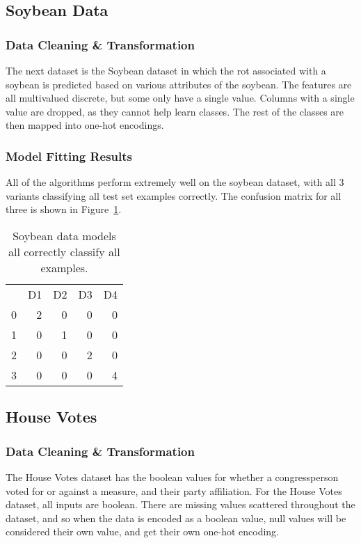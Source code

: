 \documentclass{amsart}
\begin{document}
\subsection{Soybean Data}
\subsubsection*{Data Cleaning \& Transformation}
The next dataset is the Soybean dataset\cite{soybeandataset} in which the rot associated with a soybean is predicted
based on various attributes of the soybean. The features are all multivalued discrete, but some only have a
single value. Columns with a single value are dropped, as they cannot help learn classes. The rest of the classes
are then mapped into one-hot encodings.

\subsubsection*{Model Fitting Results}
All of the algorithms perform extremely well on the soybean dataset, with all 3 variants classifying
all test set examples correctly. The confusion matrix for all three is shown in Figure~\ref{soybean_c}.
\begin{table}
\begin{tabular}{lrrrr}
{} &  D1 &  D2 &  D3 & D4  \\
0 &  2 &  0 &  0 &  0 \\
1 &  0 &  1 &  0 &  0 \\
2 &  0 &  0 &  2 &  0 \\
3 &  0 &  0 &  0 &  4
\end{tabular}
\label{soybean_c}
\caption{Soybean data models all correctly classify all examples.}
\end{table}

\subsection{House Votes}
\subsubsection*{Data Cleaning \& Transformation}
The House Votes dataset\cite{housedataset} has the boolean values for whether a congressperson voted for or against a measure, and their party
affiliation. For the House Votes dataset, all inputs are boolean. There are missing values scattered throughout the dataset, and
so when the data is encoded as a boolean value, null values will be considered their own value, and get their own one-hot
encoding.
\end{document}
